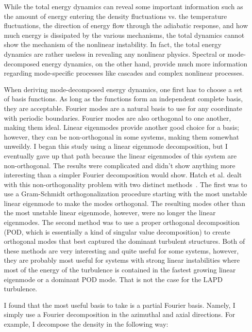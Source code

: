 While the total energy dynamics can reveal some important information such as the amount of energy entering the density fluctuations vs. the temperature fluctuations, the direction of
energy flow through the adiabatic response, and how much energy is dissipated by the various mechanisms, the total dynamics cannot show the mechanism of the nonlinear instability.
In fact, the total energy dynamics are rather useless in revealing any nonlinear physics. Spectral or mode-decomposed energy dynamics, on the other hand, provide much more information
regarding mode-specific processes like cascades and complex nonlinear processes.

When deriving mode-decomposed energy dynamics, one first has to choose a set of basis functions. As long as the functions form an independent complete basis, they are acceptable.
Fourier modes are a natural basis to use for any coordinate with periodic boundaries. Fourier modes are also orthogonal to one another, making them ideal. Linear eigenmodes provide
another good choice for a basis; however, they can be non-orthogonal in some systems, making them somewhat unweildy. I began this study using a linear eigenmode decomposition,
but I eventually gave up that path because the linear eigenmodes of this system are non-orthogonal. The results were complicated and didn't show anything more interesting than a simpler
Fourier decomposition would show. Hatch et al. dealt with this non-orthogonality problem with two distinct methods~\cite{hatch2011}. The first was to use a Gram-Schmidt orthogonalization
procedure starting with the most unstable linear eigenmode to make the modes orthogonal. The resulting modes other than the most unstable linear eigenmode, however, were no longer
the linear eigenmodes. The second method was to use a proper orthogonal decomposition (POD, which is essentially a kind of singular value decomposition) to create orthogonal modes that best
captured the dominant turbulent structures. Both of these methods are very interesting and quite useful for some systems, however, they are probably most useful for systems with
strong linear instabilities where most of the energy of the turbulence is contained in the fastest growing linear eigenmode or a dominant POD mode. That is not the case for the LAPD turbulence.

I found that the most useful basis to take is a partial Fourier basis. Namely, I simply use a Fourier decomposition in the azimuthal and axial directions.
For example, I decompose the density in the following way:

